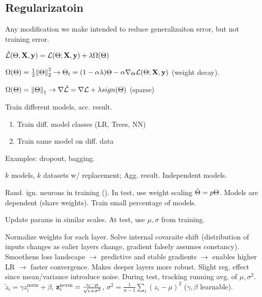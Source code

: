 \subsection{Regularizatoin}
Any modification we make intended to reduce generalizaiton error, but not training error.
\begin{center}
    \(\tilde {\mathcal{L}}(\Theta, \vb{X}, \vb{y}) = \mathcal{L}(\Theta; \vb{X}, \vb{y}) + \lambda \Omega(\Theta)\)
\end{center}

\begin{definition}[Ridge]
    \(\Omega(\Theta) = \frac{1}{2} \norm{\Theta}_2^2 \to \Theta_t = (1 - \alpha \lambda)\Theta - \alpha \nabla_\Theta \mathcal{L}(\Theta; \vb{X}, \vb{y})\) (weight decay).
\end{definition}

\begin{definition}[Lasso]
    \(\Omega(\Theta) = \norm{\Theta}_1 \to \nabla \tilde {\mathcal{L}} = \nabla \mathcal{L} + \lambda sign(\Theta)\) (sparse)
\end{definition}

\begin{definition}
    Train different models, acc. result.
    \begin{enumerate}
        \item Train diff. model classes (LR, Trees, NN)
        \item Train same model on diff. data
    \end{enumerate}
    Examples: dropout, bagging.
\end{definition}

\begin{definition}
    \(k\) models, \(k\) datasets w/ replacement; Agg. result. Independent models.
\end{definition}

\begin{definition}[Dropout]
    Rand. ign. neurons in training (). In test, use weight scaling \(\tilde{\Theta} = p\Theta\). Models are dependent (share weights). Train small percentage of models.
\end{definition}

\begin{definition}
    Update params in similar scales. At test, use \(\mu, \sigma\) from training.
\end{definition}

\begin{definition}
    Normalize weights for each layer. Solve internal covaraite shift (distribution of inputs changes as ealier layers change, gradient falsely assumes constancy). Smoothens loss landscape \(\to\) predictive and stable gradients \(\to\) enables higher LR \(\to\) faster convergence.
    Makes deeper layers more robust. Slight reg. effect since mean/variance introduce noise. During test, tracking running avg. of \(\mu, \sigma^2\).
    \(\tilde z_i = \gamma z_i^{\text{norm}} + \beta\), \(\vb{z}_i^{\text{norm}} = \frac{z_i - \mu}{\sqrt{\epsilon + \sigma^2}}\), \(\sigma^2 = \frac{1}{n-1}\sum_i(z_i - \mu)^2\) (\(\gamma, \beta\) learnable).
\end{definition}

